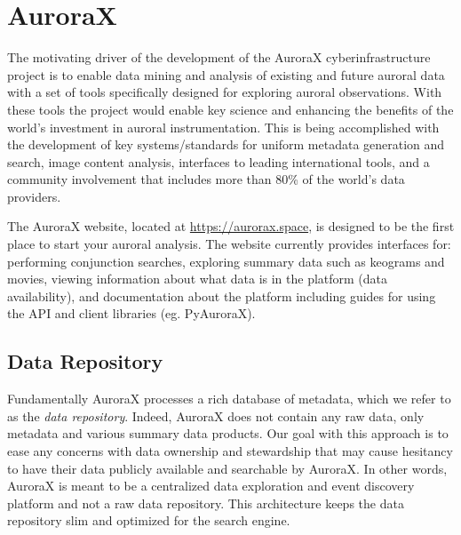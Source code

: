 \documentclass[utf8]{FrontiersinHarvard} %
\begin{document}
\section{AuroraX}\label{aurorax}
The motivating driver of the development of the AuroraX cyberinfrastructure project is to enable data mining and analysis of existing and future auroral data with a set of tools specifically designed for exploring auroral observations. With these tools the project would enable key science and enhancing the benefits of the world's investment in auroral instrumentation. This is being accomplished with the development of key systems/standards for uniform metadata generation and search, image content analysis, interfaces to leading international tools, and a community involvement that includes more than 80\% of the world's data providers. 

The AuroraX website, located at \url{https://aurorax.space}, is designed to be the first place to start your auroral analysis. The website currently provides interfaces for: performing conjunction searches, exploring summary data such as keograms and movies, viewing information about what data is in the platform (data availability), and documentation about the platform including guides for using the API and client libraries (eg. PyAuroraX).

\subsection{Data Repository}
Fundamentally AuroraX processes a rich database of metadata, which we refer to as the \textit{data repository}. Indeed, AuroraX does not contain any raw data, only metadata and various summary data products. Our goal with this approach is to ease any concerns with data ownership and stewardship that may cause hesitancy to have their data publicly available and searchable by AuroraX. In other words, AuroraX is meant to be a centralized data exploration and event discovery platform and not a raw data repository. This architecture keeps the data repository slim and optimized for the search engine.
\end{document}
